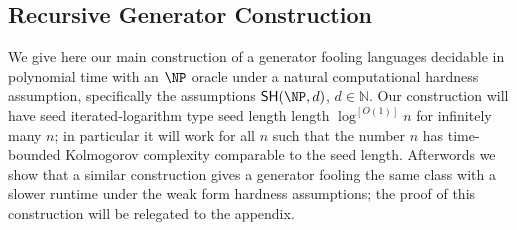 \subsection{Recursive Generator Construction}
We give here our main construction of a generator fooling languages decidable in polynomial time with an $\NP$ oracle under a natural computational hardness assumption, specifically the assumptions $\SH(\NP,d)$, $d \in \mathbb{N}$. Our construction will have seed iterated-logarithm type seed length length $\log^{[O(1)]}n$ for infinitely many $n$; in particular it will work for all $n$ such that the number $n$ has time-bounded Kolmogorov complexity comparable to the seed length. Afterwords we show that a similar construction gives a generator fooling the same class with a slower runtime under the weak form hardness assumptions; the proof of this construction will be relegated to the appendix.


